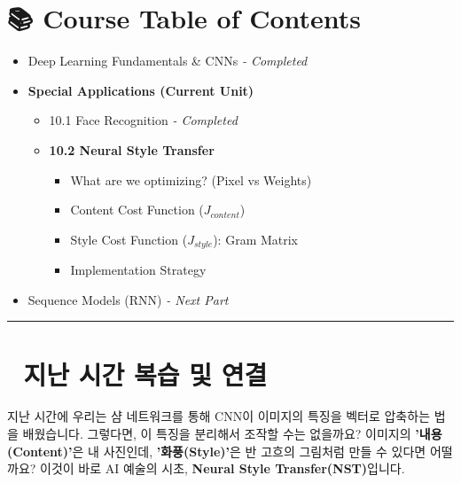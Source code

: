 \documentclass[11pt,a4paper]{book}
\theoremstyle{definition}
\begin{document}
\section*{📚 Course Table of Contents}
\begin{itemize}
    \item[Chapter 1-9.] Deep Learning Fundamentals \& CNNs \textit{- Completed}
    \item[\textbf{Chapter 10.}] \textbf{Special Applications (Current Unit)}
    \begin{itemize}
        \item 10.1 Face Recognition \textit{- Completed}
        \item \textbf{10.2 Neural Style Transfer}
        \begin{itemize}
            \item What are we optimizing? (Pixel vs Weights)
            \item Content Cost Function ($J_{content}$)
            \item Style Cost Function ($J_{style}$): Gram Matrix
            \item Implementation Strategy
        \end{itemize}
    \end{itemize}
    \item[Chapter 11.] Sequence Models (RNN) \textit{- Next Part}
\end{itemize}

\vspace{0.5cm}
\hrule
\vspace{0.5cm}

\section*{🔗 지난 시간 복습 및 연결}
지난 시간에 우리는 샴 네트워크를 통해 CNN이 이미지의 특징을 벡터로 압축하는 법을 배웠습니다.
그렇다면, 이 특징을 분리해서 조작할 수는 없을까요? 이미지의 \textbf{'내용(Content)'}은 내 사진인데, \textbf{'화풍(Style)'}은 반 고흐의 그림처럼 만들 수 있다면 어떨까요?
이것이 바로 AI 예술의 시초, \textbf{Neural Style Transfer(NST)}입니다.

\end{document}
